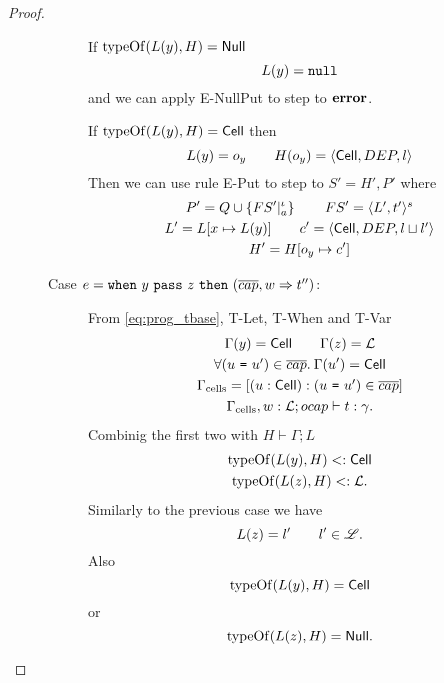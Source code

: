 \begin{proof}
\begin{description}
\begin{description}
          If $\mbox{$\mathrm{typeOf}$}(L(y), H) = \mbox{$\mathsf{Null}$}$
          \begin{equation*}
            L(y) = \mbox{\mdseries\texttt{null}}
          \end{equation*}
          and we can apply {\sc E-NullPut} to step to $\mbox{{\bf error}}$. \contradiction

          If $\mbox{$\mathrm{typeOf}$}(L(y), H) = \mbox{$\mathsf{Cell}$}$ then 
          \begin{equation*}
            L(y) = o_y \quad\quad H(o_y) = \mbox{$\langle \mbox{$\mathsf{Cell}$}{}, DEP, l \rangle$}
          \end{equation*}
          Then we can use rule {\sc E-Put} to step to $S' = H', P'$ where 
          \begin{equation*}
            \begin{gathered}
              P' = Q \cup \left\{FS'|_a^\iota \right\} \quad\quad FS' = \mbox{$\langle L',
              t' \rangle^s$} \\
              L' = L[x \mapsto L(y)] \quad\quad c' = \mbox{$\langle \mbox{$\mathsf{Cell}$}{}, DEP, l \sqcup l' \rangle$} \\
              H' = H[o_y \mapsto c']
            \end{gathered}
          \end{equation*}
          \contradiction

        \item[Case $e = \mbox{\mdseries\texttt{when}~$y$~\texttt{pass}~$z$~\texttt{then}~$(\overline{cap}, w \Rightarrow t'')$}$:]
          From \eqref{eq:prog_tbase}, {\sc T-Let}, {\sc T-When} and {\sc T-Var}
          \begin{equation*}
            \begin{gathered}
              \Gamma(y) = \mbox{$\mathsf{Cell}$} \quad\quad \Gamma(z) = \mbox{$\mathcal{L}$} \\
              \forall(\mbox{\mdseries$u$~\texttt{=}~$u'$}) \in \overline{cap}. \: \Gamma(u') = \mbox{$\mathsf{Cell}$} \\
              \Gamma_{\text{cells}} = [(u: \mbox{$\mathsf{Cell}$}): (\mbox{\mdseries$u$~\texttt{=}~$u'$}) \in
              \overline{cap}] \\
              \mbox{$\Gamma_{\text{cells}}, w: \mbox{$\mathcal{L}$};\mbox{$ocap$}\vdash t:\gamma$}.
            \end{gathered}
          \end{equation*}
          Combinig the first two with $H \vdash \Gamma;L$
          \begin{gather*}
            \mbox{$\mathrm{typeOf}$}(L(y), H) <: \mbox{$\mathsf{Cell}$} \\
            \mbox{$\mathrm{typeOf}$}(L(z), H) <: \mbox{$\mathcal{L}$}.
          \end{gather*}
          Similarly to the previous case we have
          \begin{equation*}
            L(z) = l' \quad\quad l' \in \mbox{$\mathscr{L}$}.
          \end{equation*}
          Also
          \begin{equation*}
            \mbox{$\mathrm{typeOf}$}(L(y), H) = \mbox{$\mathsf{Cell}$}
          \end{equation*}
          or
          \begin{equation*}
            \mbox{$\mathrm{typeOf}$}(L(z), H) = \mbox{$\mathsf{Null}$}.
          \end{equation*}


\end{description}
\end{description}
\end{proof}
